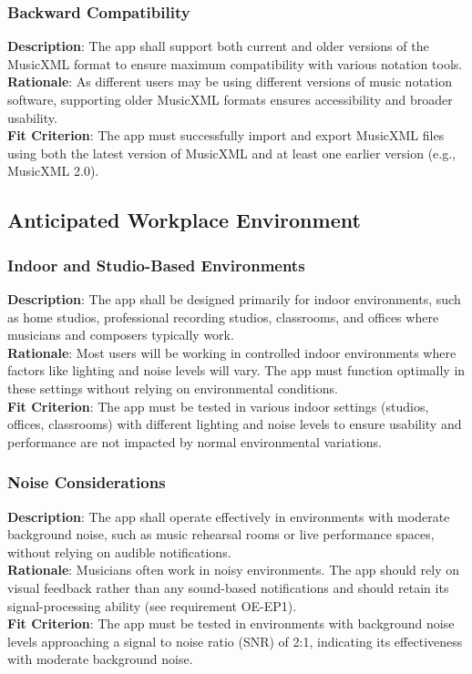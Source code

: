 \documentclass[12pt]{article}
\begin{document}
\subsubsection*{Backward Compatibility}
\textbf{Description}: The app shall support both current and older versions of the MusicXML format to ensure maximum compatibility with various notation tools.\\
\textbf{Rationale}: As different users may be using different versions of music notation software, supporting older MusicXML formats ensures accessibility and broader usability.\\
\textbf{Fit Criterion}: The app must successfully import and export MusicXML files using both the latest version of MusicXML and at least one earlier version (e.g., MusicXML 2.0).

\subsection{Anticipated Workplace Environment}
\subsubsection*{Indoor and Studio-Based Environments}
\textbf{Description}: The app shall be designed primarily for indoor environments, such as home studios, professional recording studios, classrooms, and offices where musicians and composers typically work.\\
\textbf{Rationale}: Most users will be working in controlled indoor environments where factors like lighting and noise levels will vary. The app must function optimally in these settings without relying on environmental conditions.\\
\textbf{Fit Criterion}: The app must be tested in various indoor settings (studios, offices, classrooms) with different lighting and noise levels to ensure usability and performance are not impacted by normal environmental variations.
\subsubsection*{Noise Considerations}
\textbf{Description}: The app shall operate effectively in environments with moderate background noise, such as music rehearsal rooms or live performance spaces, without relying on audible notifications.\\
\textbf{Rationale}: Musicians often work in noisy environments. The app should rely on visual feedback rather than any sound-based notifications and should retain its signal-processing ability (see requirement OE-EP1).\\
\textbf{Fit Criterion}: The app must be tested in environments with background noise levels approaching a signal to noise ratio (SNR) of 2:1, indicating its effectiveness with moderate background noise.
\end{document}
